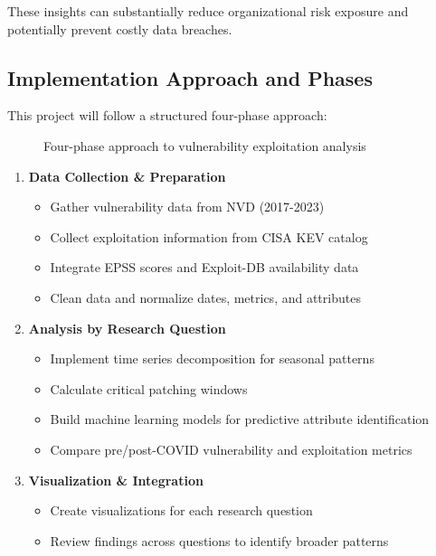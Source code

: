 \documentclass[runningheads]{llncs}
\begin{document}
These insights can substantially reduce organizational risk exposure and potentially prevent costly data breaches.

\subsection{Implementation Approach and Phases}
This project will follow a structured four-phase approach:

\begin{figure}
\caption{Four-phase approach to vulnerability exploitation analysis} 
\label{fig:phases}
\end{figure}

\begin{enumerate}
    \item \textbf{Data Collection \& Preparation}
    \begin{itemize}
        \item Gather vulnerability data from NVD (2017-2023)
        \item Collect exploitation information from CISA KEV catalog
        \item Integrate EPSS scores and Exploit-DB availability data
        \item Clean data and normalize dates, metrics, and attributes
    \end{itemize}
    
    \item \textbf{Analysis by Research Question}
    \begin{itemize}
        \item Implement time series decomposition for seasonal patterns
        \item Calculate critical patching windows
        \item Build machine learning models for predictive attribute identification
        \item Compare pre/post-COVID vulnerability and exploitation metrics
    \end{itemize}
    
    \item \textbf{Visualization \& Integration}
    \begin{itemize}
        \item Create visualizations for each research question
        \item Review findings across questions to identify broader patterns
    \end{itemize}
    

\end{enumerate}
\end{document}
